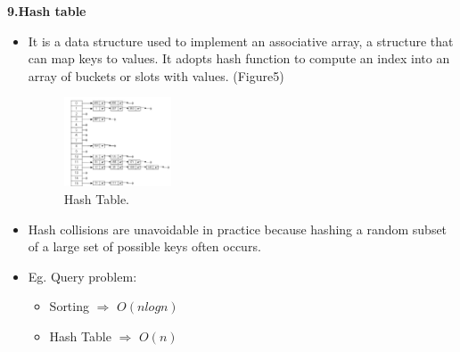 \pagebreak
\textbf{9.Hash table}
\begin{itemize}
\item 
It is a data structure used to implement an associative array, a structure that can map keys to values. It adopts hash function to compute an index into an array of buckets or slots with values. (Figure5)
\begin{figure}
\centering
\includegraphics[width=0.3\textwidth]{hash_table.png}
\caption{\label{fig:Hash Table}Hash Table.}
\end{figure}
\item
Hash collisions are unavoidable in practice because hashing a random subset of a large set of possible keys often occurs.
\item
Eg. Query problem:
\begin{itemize}
\item 
Sorting $\Rightarrow$ $O(nlogn)$
\item
Hash Table $\Rightarrow$ $O(n)$
\end{itemize}
\end{itemize}


